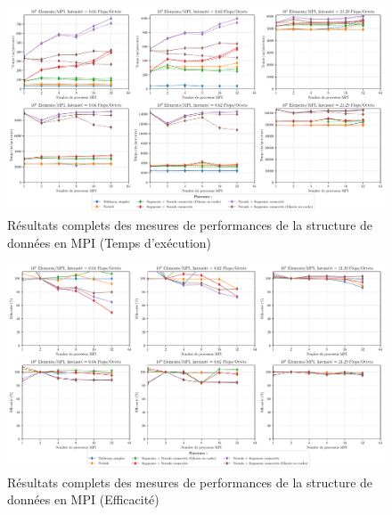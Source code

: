 \begin{figure}
	\includegraphics[width=\textwidth]{img/bench_mesh_mpi_time_full.pdf}
	\caption{Résultats complets des mesures de performances de la structure de données en MPI (Temps d'exécution)}
\end{figure}

\begin{figure}
	\includegraphics[width=\textwidth]{img/bench_mesh_mpi_efficiency_full.pdf}
	\caption{Résultats complets des mesures de performances de la structure de données en MPI (Efficacité)}
\end{figure}